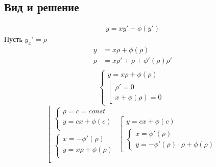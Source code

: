 \documentclass[fontsize=10pt,a4paper,fleqn]{scrreprt} %
\numberwithin{equation}{section}
\begin{document}
\subsection{Вид и решение}
\begin{align}
  y = xy' + \phi(y')
\end{align}
Пусть $y_x' = \rho$
\begin{align*}
  y &= x\rho+\phi(\rho)\\
  \rho &= x\rho' + \rho + \phi'(\rho)\rho'\\
\end{align*}
\[
\begin{cases}
  y = x\rho + \phi(\rho)\\
  \left[
    \begin{array}{ll}
      \rho' = 0\\
      x + \phi(\rho) = 0
    \end{array}
    \right.
\end{cases}
\]
\[
\left[
\begin{array}{ll}
  \begin{cases}
    \rho = c = const\\
    y = cx + \phi(c)\\
  \end{cases}\\
  \begin{cases}
    x = -\phi'(\rho)\\
    y = x\rho + \phi(\rho)\\
  \end{cases}\\
\end{array}
\right.
\left[
  \begin{array}{ll}
    y = cx+ \phi(c)\\
    \begin{cases}
      x = \phi'(\rho)\\
      y = -\phi'(\rho)\cdot\rho + \phi(\rho)
    \end{cases}
  \end{array}
\right.
\]
\end{document}
